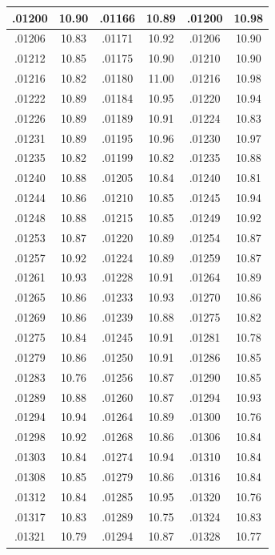 \documentclass[11pt]{report}
\begin{document}
\begin{appendices}
\begin{longtable}{|c|c||c|c||c|c|}
.01200 & 10.90 & .01166 & 10.89 & .01200 & 10.98\\\hline
.01206 & 10.83 & .01171 & 10.92 & .01206 & 10.90\\\hline
.01212 & 10.85 & .01175 & 10.90 & .01210 & 10.90\\\hline
.01216 & 10.82 & .01180 & 11.00 & .01216 & 10.98\\\hline
.01222 & 10.89 & .01184 & 10.95 & .01220 & 10.94\\\hline
.01226 & 10.89 & .01189 & 10.91 & .01224 & 10.83\\\hline
.01231 & 10.89 & .01195 & 10.96 & .01230 & 10.97\\\hline
.01235 & 10.82 & .01199 & 10.82 & .01235 & 10.88\\\hline
.01240 & 10.88 & .01205 & 10.84 & .01240 & 10.81\\\hline
.01244 & 10.86 & .01210 & 10.85 & .01245 & 10.94\\\hline
.01248 & 10.88 & .01215 & 10.85 & .01249 & 10.92\\\hline
.01253 & 10.87 & .01220 & 10.89 & .01254 & 10.87\\\hline
.01257 & 10.92 & .01224 & 10.89 & .01259 & 10.87\\\hline
.01261 & 10.93 & .01228 & 10.91 & .01264 & 10.89\\\hline
.01265 & 10.86 & .01233 & 10.93 & .01270 & 10.86\\\hline
.01269 & 10.86 & .01239 & 10.88 & .01275 & 10.82\\\hline
.01275 & 10.84 & .01245 & 10.91 & .01281 & 10.78\\\hline
.01279 & 10.86 & .01250 & 10.91 & .01286 & 10.85\\\hline
.01283 & 10.76 & .01256 & 10.87 & .01290 & 10.85\\\hline
.01289 & 10.88 & .01260 & 10.87 & .01294 & 10.93\\\hline
.01294 & 10.94 & .01264 & 10.89 & .01300 & 10.76\\\hline
.01298 & 10.92 & .01268 & 10.86 & .01306 & 10.84\\\hline
.01303 & 10.84 & .01274 & 10.94 & .01310 & 10.84\\\hline
.01308 & 10.85 & .01279 & 10.86 & .01316 & 10.84\\\hline
.01312 & 10.84 & .01285 & 10.95 & .01320 & 10.76\\\hline
.01317 & 10.83 & .01289 & 10.75 & .01324 & 10.83\\\hline
.01321 & 10.79 & .01294 & 10.87 & .01328 & 10.77\\\hline

\end{longtable}
\end{appendices}
\end{document}
